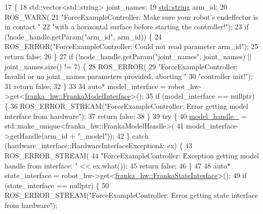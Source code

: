 \begin{DoxyCode}
17                                                               \{
18   std::vector<std::string> joint\_names;
19   \hyperlink{namespacetesting_1_1internal_a8e8ff5b11e64078831112677156cb111}{std::string} arm\_id;
20   ROS\_WARN(
21       \textcolor{stringliteral}{"ForceExampleController: Make sure your robot's endeffector is in contact "}
22       \textcolor{stringliteral}{"with a horizontal surface before starting the controller!"});
23   \textcolor{keywordflow}{if} (!node\_handle.getParam(\textcolor{stringliteral}{"arm\_id"}, arm\_id)) \{
24     ROS\_ERROR(\textcolor{stringliteral}{"ForceExampleController: Could not read parameter arm\_id"});
25     \textcolor{keywordflow}{return} \textcolor{keyword}{false};
26   \}
27   \textcolor{keywordflow}{if} (!node\_handle.getParam(\textcolor{stringliteral}{"joint\_names"}, joint\_names) || joint\_names.size() != 7) \{
28     ROS\_ERROR(
29         \textcolor{stringliteral}{"ForceExampleController: Invalid or no joint\_names parameters provided, aborting "}
30         \textcolor{stringliteral}{"controller init!"});
31     \textcolor{keywordflow}{return} \textcolor{keyword}{false};
32   \}
33 
34   \textcolor{keyword}{auto}* model\_interface = robot\_hw->get<\hyperlink{classfranka__hw_1_1FrankaModelInterface}{franka\_hw::FrankaModelInterface}>();
35   \textcolor{keywordflow}{if} (model\_interface == \textcolor{keyword}{nullptr}) \{
36     ROS\_ERROR\_STREAM(\textcolor{stringliteral}{"ForceExampleController: Error getting model interface from hardware"});
37     \textcolor{keywordflow}{return} \textcolor{keyword}{false};
38   \}
39   \textcolor{keywordflow}{try} \{
40     \hyperlink{classfranka__example__controllers_1_1ForceExampleController_a97bc82b7bea28c31389b857f25adbe47}{model\_handle\_} = std::make\_unique<franka\_hw::FrankaModelHandle>(
41         model\_interface->getHandle(arm\_id + \textcolor{stringliteral}{"\_model"}));
42   \} \textcolor{keywordflow}{catch} (hardware\_interface::HardwareInterfaceException& ex) \{
43     ROS\_ERROR\_STREAM(
44         \textcolor{stringliteral}{"ForceExampleController: Exception getting model handle from interface: "} << ex.what());
45     \textcolor{keywordflow}{return} \textcolor{keyword}{false};
46   \}
47 
48   \textcolor{keyword}{auto}* state\_interface = robot\_hw->get<\hyperlink{classfranka__hw_1_1FrankaStateInterface}{franka\_hw::FrankaStateInterface}>();
49   \textcolor{keywordflow}{if} (state\_interface == \textcolor{keyword}{nullptr}) \{
50     ROS\_ERROR\_STREAM(\textcolor{stringliteral}{"ForceExampleController: Error getting state interface from hardware"});

\end{DoxyCode}
